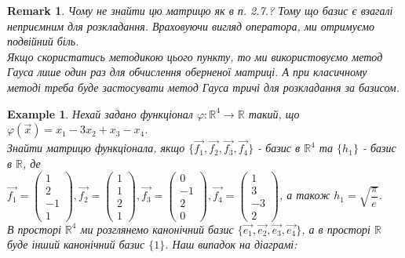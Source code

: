 \documentclass[a4paper, 10pt]{article}
\theoremstyle{theoremdd}
\theoremstyle{theoremdd}
\theoremstyle{theoremdd}
\theoremstyle{theoremdd}
\newtheorem{example}[theorem]{Example}
\theoremstyle{theoremdd}
\theoremstyle{theoremdd}
\newtheorem{remark}[theorem]{Remark}
\theoremstyle{theoremdd}
\theoremstyle{theoremdd}
\begin{document}
\begin{remark}
Чому не знайти цю матрицю як в п. 2.7.? Тому що базис є взагалі неприємним для розкладання. Враховуючи вигляд оператора, ми отримуємо подвійний біль.\\
Якщо скористатись методикою цього пункту, то ми використовуємо метод Гауса лише один раз для обчислення оберненої матриці. А при класичному методі треба буде застосувати метод Гауса тричі для розкладання за базисом.
\end{remark}

\begin{example}
Нехай задано функціонал $\varphi: \mathbb{R}^4 \to \mathbb{R}$ такий, що\\
$\varphi(\vec{x}) = x_1 - 3x_2 + x_3 - x_4$.\\
Знайти матрицю функціонала, якщо $\{\vec{f_1},\vec{f_2},\vec{f_3},\vec{f_4} \}$ - базис в $\mathbb{R}^4$ та $\{ h_1 \}$ - базис в $\mathbb{R}$, де\\
$\vec{f_1} = \begin{pmatrix}
1 \\ 2 \\ -1 \\ 1
\end{pmatrix},\vec{f_2} = \begin{pmatrix}
1 \\ 1 \\ 2 \\ 1
\end{pmatrix},\vec{f_3} = \begin{pmatrix}
0 \\ -1 \\ 2 \\ 0
\end{pmatrix},\vec{f_4} = \begin{pmatrix}
1 \\ 3 \\ -3 \\ 2
\end{pmatrix}$, а також $h_1 = \sqrt{\dfrac{\pi}{e}}$.\\
В просторі $\mathbb{R}^4$ ми розглянемо канонічний базис $\{\vec{e_1},\vec{e_2},\vec{e_3},\vec{e_4}\}$, а в просторі $\mathbb{R}$ буде інший канонічний базис $\{1\}$. Наш випадок на діаграмі:\\
\end{example}
\end{document}
